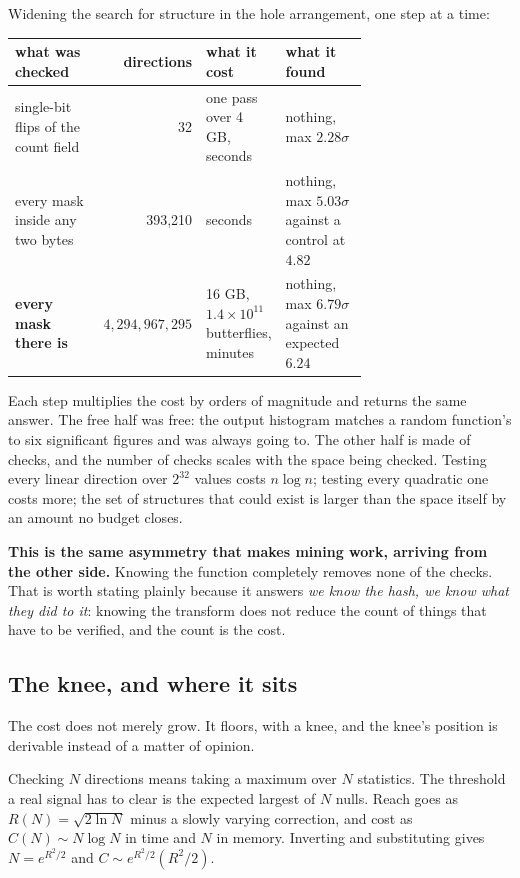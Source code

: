 Widening the search for structure in the hole arrangement, one step at a time:

\begin{center}
\begin{tabular}{@{}p{0.26\linewidth}rp{0.2\linewidth}p{0.24\linewidth}@{}}
\toprule
what was checked & directions & what it cost & what it found \\
\midrule
single-bit flips of the count field & 32 & one pass over 4 GB, seconds & nothing, max \(2.28\sigma\) \\
every mask inside any two bytes & 393,210 & seconds & nothing, max \(5.03\sigma\) against a control at \(4.82\) \\
\textbf{every mask there is} & \(4{,}294{,}967{,}295\) & 16 GB, \(1.4\times10^{11}\) butterflies, minutes & nothing, max \(6.79\sigma\) against an expected \(6.24\) \\
\bottomrule
\end{tabular}
\end{center}

Each step multiplies the cost by orders of magnitude and returns the same answer. The free half was free: the output histogram matches a random function's to six significant figures and was always going to. The other half is made of checks, and the number of checks scales with the space being checked. Testing every linear direction over \(2^{32}\) values costs \(n\log n\); testing every quadratic one costs more; the set of structures that could exist is larger than the space itself by an amount no budget closes.

\textbf{This is the same asymmetry that makes mining work, arriving from the other side.} Knowing the function completely removes none of the checks. That is worth stating plainly because it answers \emph{we know the hash, we know what they did to it}: knowing the transform does not reduce the count of things that have to be verified, and the count is the cost.

\subsection{The knee, and where it sits}

The cost does not merely grow. It floors, with a knee, and the knee's position is derivable instead of a matter of opinion.

Checking \(N\) directions means taking a maximum over \(N\) statistics. The threshold a real signal has to clear is the expected largest of \(N\) nulls. Reach goes as \(R(N) = \sqrt{2\ln N}\) minus a slowly varying correction, and cost as \(C(N) \sim N\log N\) in time and \(N\) in memory. Inverting and substituting gives \(N = e^{R^2/2}\) and \(C \sim e^{R^2/2}(R^2/2)\).

